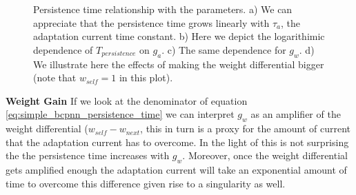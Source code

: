 \documentclass[10pt,a4paper]{article}
\begin{document}
\begin{figure}[H]%
    \centering
    \qquad
    \hfill
     \qquad
    \caption{Persistence time relationship with the parameters. a) We can appreciate that the persistence time grows linearly with $\tau_a$, the adaptation current time constant. b) Here we depict the logarithimic dependence of $T_{persistence}$ on $g_a$. c) The same dependence for $g_w$. d) We illustrate here the effects of making the weight differential bigger (note that $w_{self}=1$ in this plot). }
    \label{fig:simple_bcpnn_comparison}%
\end{figure}

\textbf{Weight Gain}
If we look at the denominator of equation \ref{eq:simple_bcpnn_persistence_time} we can interpret $g_w$ as an amplifier of the weight differential ($w_{self} - w_{next}$, this in turn is a proxy for the amount of current that the adaptation current has to overcome. In the light of this is not surprising the the persistence time increases with $g_w$. Moreover, once the weight differential gets amplified enough the adaptation current will take an exponential amount of time to overcome this difference given rise to a singularity as well.
\end{document}
